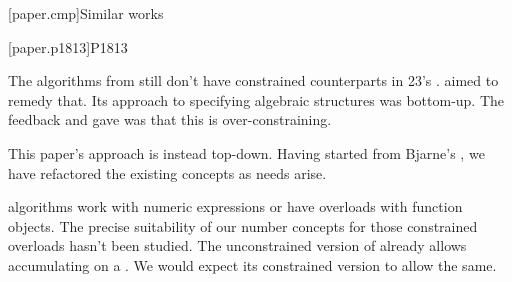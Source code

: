 

[paper.cmp]{Similar works}

[paper.p1813]{P1813}

\pnum
The algorithms from  still don't have constrained counterparts in \Cpp{}23's .
 aimed to remedy that.
Its approach to specifying algebraic structures was bottom-up.
The feedback  and \hrefVI{} gave was that this is over-constraining.

\pnum
This paper's approach is instead top-down.
Having started from Bjarne's ,
we have refactored the existing concepts as needs arise.

\pnum
{} algorithms work with numeric expressions or have overloads with function objects.
The precise suitability of our number concepts for those constrained overloads hasn't been studied.
The unconstrained version of  already allows accumulating on a .
We would expect its constrained version to allow the same.
